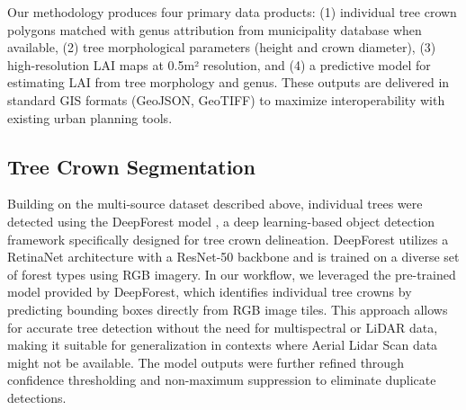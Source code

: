 Our methodology produces four primary data products: (1) individual tree crown polygons matched with genus attribution from municipality database when available, (2) tree morphological parameters (height and crown diameter), (3) high-resolution LAI maps at 0.5m² resolution, and (4) a predictive model for estimating LAI from tree morphology and genus. These outputs are delivered in standard GIS formats (GeoJSON, GeoTIFF) to maximize interoperability with existing urban planning tools.



\subsection{Tree Crown Segmentation}
Building on the multi-source dataset described above, individual trees were detected using the DeepForest model \cite{weinsteinCrossValidationDeepLearning2020}, a deep learning-based object detection framework specifically designed for tree crown delineation. DeepForest utilizes a RetinaNet architecture \cite{linFocalLossDense2017}
 with a ResNet-50 backbone and is trained on a diverse set of forest types using RGB imagery. In our workflow, we leveraged the pre-trained model provided by DeepForest, which identifies individual tree crowns by predicting bounding boxes directly from RGB image tiles. This approach allows for accurate tree detection without the need for multispectral or LiDAR data, making it suitable for generalization in contexts where Aerial Lidar Scan data might not be available. The model outputs were further refined through confidence thresholding and non-maximum suppression to eliminate duplicate detections.

